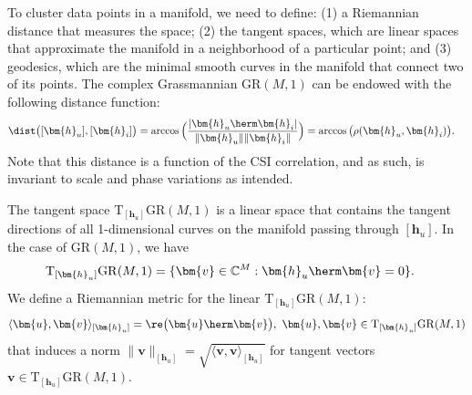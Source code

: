 
To cluster data points in a manifold, we need to define: (1) a Riemannian distance that measures the space; (2) the tangent spaces, which are linear spaces that approximate the manifold in a neighborhood of a particular point; and (3) geodesics, which are the minimal smooth curves in the manifold that connect two of its points.
The complex Grassmannian $\mathrm{GR}(M,1)$ can be endowed with the following distance function:
\begin{align*}
	\dist\big([\bm{h}_u],[\bm{h}_i]\big)&=\arccos\Big(\frac{|\bm{h}_u\herm\bm{h}_i|}{\|\bm{h}_u\|\|\bm{h}_i\|}\Big)=\arccos\big(\rho(\bm{h}_u,\bm{h}_i)\big).
\end{align*}
Note that this distance is a function of the CSI correlation, and as such, is invariant to scale and phase variations as intended.

The tangent space $\mathrm{T}_{[\bm{h}_u]}\mathrm{GR}(M,1)$ is a linear space that contains the tangent directions of all 1-dimensional curves on the manifold passing through $[\bm{h}_u]$. In the case of $\mathrm{GR}(M,1)$, we have
\begin{align}
	\mathrm{T}_{[\bm{h}_u]}\mathrm{GR}(M,1)&=\{\bm{v}\in\mathbb{C}^{M}: \bm{h}_u\herm\bm{v}=0\}. \label{usch:eqn:grasmann_tangent_space}
\end{align}
We define a Riemannian metric for the linear  $\mathrm{T}_{[\bm{h}_u]}\mathrm{GR}(M,1)$: 
\begin{equation}
	\langle \bm{u},\bm{v}\rangle_{[\bm{h}_u]} = \re\big(\bm{u}\herm\bm{v}\big),\,\,\bm{u},\bm{v}\in \mathrm{T}_{[\bm{h}_u]}\mathrm{GR}(M,1)
\end{equation}
that induces a norm $\|\bm{v}\|_{[\bm{h}_u]}=\sqrt{\langle \bm{v},\bm{v}\rangle_{[\bm{h}_u]}}$ for tangent vectors $\bm{v}\in\mathrm{T}_{[\bm{h}_u]}\mathrm{GR}(M,1)$. 

